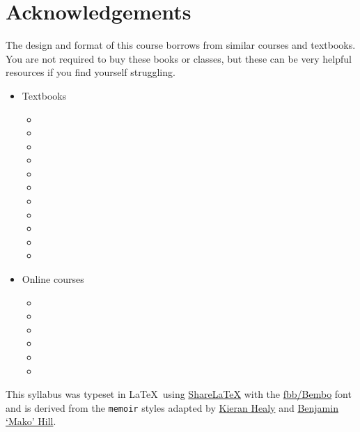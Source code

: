 \documentclass[10pt]{memoir}
\begin{document}
\section{Acknowledgements}
The design and format of this course borrows from similar courses and textbooks. You are not required to buy these books or classes, but these can be very helpful resources if you find yourself struggling.
\begin{itemize}[itemsep=1em]
    \item Textbooks
        \begin{itemize}
        \item {}
        \item {}
        \item {}
        \item {}
        \item {}
        \item {}
        \item {}
        \item {}
        \item {}
        \item {}
        \item {}
        \end{itemize}
    \item Online courses
        \begin{itemize}
        \item {}
        \item {}
        \item {}
        \item {}
        \item {}
        \item {}
        \end{itemize}
\end{itemize}

This syllabus was typeset in \LaTeX~using \href{http://www.sharelatex.com}{ShareLaTeX} with the \href{http://www.tug.dk/FontCatalogue/fbb/}{fbb/Bembo} font and is derived from the \texttt{memoir} styles adapted by \href{https://github.com/kjhealy/latex-custom-kjh}{Kieran Healy} and \href{http://projects.mako.cc/source/?p=latex_mako;a=summary}{Benjamin `Mako' Hill}.
\end{document}

